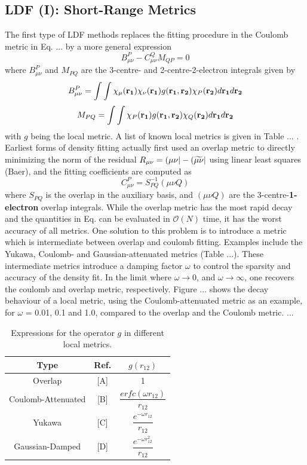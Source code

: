 \subsection{LDF (I): Short-Range Metrics}
The first type of LDF methods replaces the fitting procedure in the Coulomb metric in Eq. ... by a more general expression
\begin{equation}
B_{\mu\nu}^{P} - C_{\mu\nu}^{Q} M_{QP} = 0
\end{equation}  
\noindent where $B_{\mu\nu}^{P}$ and $M_{PQ}$ are the 3-centre- and 2-centre-2-electron integrals given by
\begin{equation}
B_{\mu\nu}^P = \int\int \chi_{\mu}(\mathbf{r_{1}})\chi_{\nu}(\mathbf{r_{1}}) g(\mathbf{r_1},\mathbf{r_2}) \chi_{P}(\mathbf{r_{2}}) d\mathbf{r_1} d\mathbf{r_2}
\end{equation}
\begin{equation}
M_{PQ} = \int\int \chi_{P}(\mathbf{r_{1}}) g(\mathbf{r_1},\mathbf{r_2}) \chi_{Q}(\mathbf{r_{2}}) d\mathbf{r_1} d\mathbf{r_2}
\end{equation}
\noindent with $g$ being the local metric. A list of known local metrics is given in Table ... . Earliest forms of density fitting actually first used an overlap metric to directly minimizing the norm of the residual $R_{\mu\nu} = \left( \mu\nu \right\rvert - \left( \widetilde{\mu\nu} \right\rvert$ using linear least squares (Baer), and the fitting coefficients are computed as
\begin{equation}
C^P_{\mu\nu} = S_{PQ}^{-1} (\mu\nu Q)
\end{equation}
\noindent where $S_{PQ}$ is the overlap in the auxiliary basis, and $(\mu\nu Q)$ are the 3-centre-\textbf{1-electron} overlap integrals. While the overlap metric has the most rapid decay and the quantities in Eq. can be evaluated in $\mathcal{O}(N)$ time, it has the worst accuracy of all metrics. One solution to this problem is to introduce a metric which is intermediate between overlap and coulomb fitting. Examples include the Yukawa, Coulomb- and Gaussian-attenuated metrics (Table ...). These intermediate metrics introduce a damping factor $\omega$ to control the sparsity and accuracy of the density fit. In the limit where $\omega \rightarrow 0$, and $\omega \rightarrow \infty$, one recovers the coulomb and overlap metric, respectively. Figure ... shows the decay behaviour of a local metric, using the Coulomb-attenuated metric as an example, for $\omega$ = 0.01, 0.1 and 1.0, compared to the overlap and the Coulomb metric. ...

\begin{table}
\makegapedcells
\centering
\begin{tabular}{ccc}
\hline
Type & Ref. & $g(r_{12})$ \\ \hline
Overlap & [A] & 1 \\
Coulomb-Attenuated & [B] & $\dfrac{erfc(\omega r_{12})}{r_{12}}$ \\
Yukawa & [C] & $\dfrac{e^{-\omega r_{12}}}{r_{12}}$ \\
Gaussian-Damped & [D] & $\dfrac{e^{-\omega r_{12}^2}}{r_{12}}$ \\ \hline
\end{tabular}
\caption{Expressions for the operator $g$ in different local metrics.}
\end{table}

